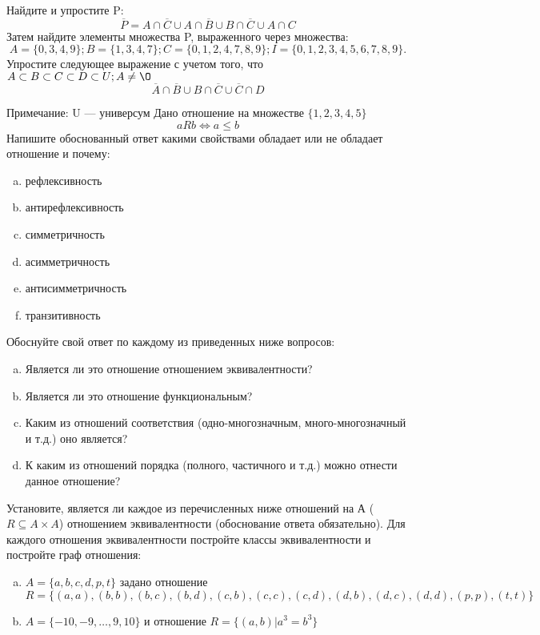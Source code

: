 \documentclass[10pt]{exam}
\begin{document}
\begin{questions}
\question
Найдите и упростите P:
\begin{equation*}
\overline{P} = A \cap \overline{C} \cup A \cap \overline{B} \cup B \cap \overline{C} \cup A \cap C
\end{equation*}
Затем найдите элементы множества P, выраженного через множества:
\begin{equation*}
A = \{0, 3, 4, 9\}; 
B = \{1, 3, 4, 7\};
C = \{0, 1, 2, 4, 7, 8, 9\};
I = \{0, 1, 2, 3, 4, 5, 6, 7, 8, 9\}.
\end{equation*}\question
Упростите следующее выражение с учетом того, что $A\subset B \subset C \subset D \subset U; A \neq \O$
\begin{equation*}
\overline{A} \cap \overline{B} \cup B \cap \overline{C} \cup \overline{C} \cap D
\end{equation*}

Примечание: U — универсум\question
Дано отношение на множестве $\{1, 2, 3, 4, 5\}$ 
\begin{equation*}
aRb \iff a \leq b
\end{equation*}
Напишите обоснованный ответ какими свойствами обладает или не обладает отношение и почему:   
\begin{enumerate} [a)]\setcounter{enumi}{0}
\item рефлексивность
\item антирефлексивность
\item симметричность
\item асимметричность
\item антисимметричность
\item транзитивность
\end{enumerate}

Обоснуйте свой ответ по каждому из приведенных ниже вопросов:
\begin{enumerate} [a)]\setcounter{enumi}{0}
    \item Является ли это отношение отношением эквивалентности?
    \item Является ли это отношение функциональным?
    \item Каким из отношений соответствия (одно-многозначным, много-многозначный и т.д.) оно является?
    \item К каким из отношений порядка (полного, частичного и т.д.) можно отнести данное отношение?
\end{enumerate}


\question
Установите, является ли каждое из перечисленных ниже отношений на А ($R \subseteq A \times A$) отношением эквивалентности (обоснование ответа обязательно). Для каждого отношения эквивалентности постройте классы 
эквивалентности и постройте граф отношения:
\begin{enumerate} [a)]\setcounter{enumi}{0}
\item $A = \{a, b, c, d, p, t\}$ задано отношение $R = \{(a, a), (b, b), (b, c), (b, d), (c, b), (c, c), (c, d), (d, b), (d, c), (d, d), (p,p), (t,t)\}$
\item $A = \{-10, -9, … , 9, 10\}$ и отношение $R = \{(a,b)|a^{3} = b^{3}\}$


\end{enumerate}
\end{questions}
\end{document}
